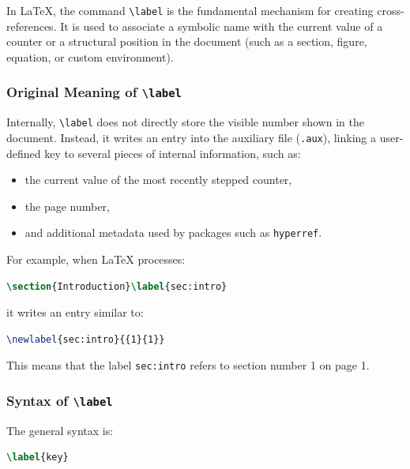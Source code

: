 In \LaTeX{}, the command \lstinline|\label| is the fundamental mechanism for creating cross-references. It is used to associate a symbolic name with the current value of a counter or a structural position in the document (such as a section, figure, equation, or custom environment).

\subsubsection{Original Meaning of \texttt{\textbackslash label}}

Internally, \lstinline|\label| does not directly store the visible number shown in the document. Instead, it writes an entry into the auxiliary file (\texttt{.aux}), linking a user-defined key to several pieces of internal information, such as:

\begin{itemize}
\item the current value of the most recently stepped counter,
\item the page number,
\item and additional metadata used by packages such as \texttt{hyperref}.
\end{itemize}

For example, when LaTeX processes:

\begin{lstlisting}[language=LaTeX]
\section{Introduction}\label{sec:intro}
\end{lstlisting}

it writes an entry similar to:

\begin{lstlisting}[language=LaTeX]
\newlabel{sec:intro}{{1}{1}}
\end{lstlisting}

This means that the label \lstinline|sec:intro| refers to section number 1 on page 1.

\subsubsection{Syntax of \texttt{\textbackslash label}}

The general syntax is:

\begin{lstlisting}[language=LaTeX]
\label{key}
\end{lstlisting}

